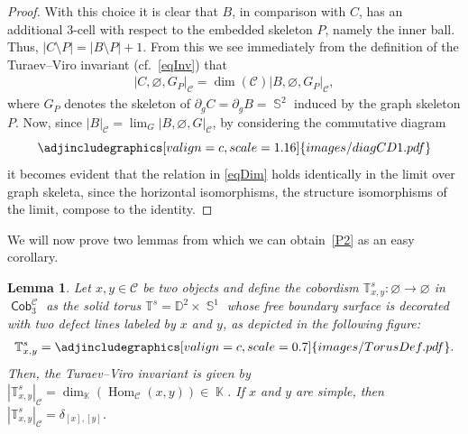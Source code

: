 \documentclass[pdftex]{sigma}
\DeclareMathOperator{\Hom}{Hom}
\DeclareMathOperator{\K}{\mathbb{K}}
\DeclareMathOperator{\Sp}{\mathbb{S}}
\DeclareMathOperator{\Cob}{\mathsf{Cob}}
\numberwithin{equation}{section}
\newtheorem{Lemma}[Lemma]{Lemma}
\theoremstyle{definition}
\begin{document}
\begin{proof}
 With this choice it is clear that $B$, in comparison with $C$, has an additional 3-cell with respect to the embedded skeleton $P$, namely the inner ball. Thus, $|C\setminus P| = |B \setminus P| +1$. From this we see immediately from the definition of the Turaev--Viro invariant (cf.~\eqref{eqInv}) that
 \begin{align}
 \label{eqDim}
 |C, \varnothing, G_P|_{\mathcal{C}} = \dim(\mathcal{C}) |B, \varnothing, G_P|_{\mathcal{C}},
 \end{align}
 where $G_P$ denotes the skeleton of $\partial_gC = \partial_gB = \Sp^2$ induced by the graph skeleton $P$. Now, since $|B|_{\mathcal{C}} = \lim_G|B, \varnothing, G|_{\mathcal{C}}$, by considering the commutative diagram
 \[
 \centering
 \adjincludegraphics[valign=c, scale = 1.16]{images/diagCD1.pdf}
 \]
 it becomes evident that the relation in \eqref{eqDim} holds identically in the limit over graph skeleta, since the horizontal isomorphisms, the structure isomorphisms of the limit, compose to the identity.
\end{proof}

We will now prove two lemmas from which we can obtain~\ref{P2} as an easy corollary.

\begin{Lemma}
\label{lemTorxy}
 Let $x, y \in \mathcal{C}$ be two objects and define the cobordism $\mathbb{T}_{x,y}^s\colon \varnothing \rightarrow \varnothing$ in $\Cob_3^{\mathcal{C}}$ as the solid torus $\mathbb{T}^s = \mathbb{D}^2 \times \Sp^1$ whose free boundary surface is decorated with two defect lines labeled by $x$ and $y$, as depicted in the following figure:
 \begin{align*}
 \mathbb{T}_{x,y}^s = \adjincludegraphics[valign=c, scale = 0.7]{images/TorusDef.pdf}.
 \end{align*}
 Then, the Turaev--Viro invariant is given by $|\mathbb{T}_{x,y}^s|_{\mathcal{C}} = \dim_{\K}\left( \Hom_{\mathcal{C}}(x, y) \right) \in \K$. If $x$ and $y$ are simple, then $|\mathbb{T}_{x,y}^s|_{\mathcal{C}} = \delta_{[x], [y]}$.
\end{Lemma}
\end{document}
